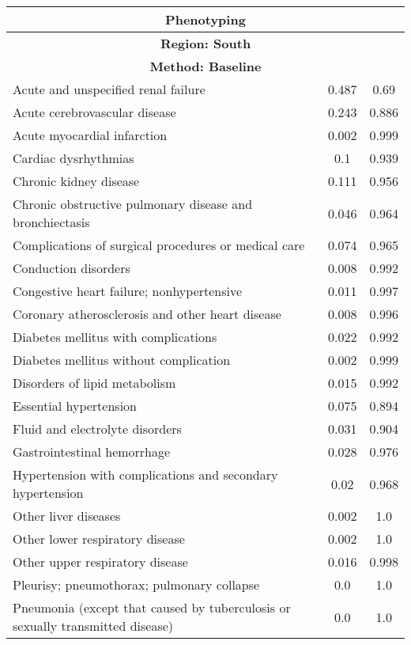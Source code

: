 \documentclass{article}
\begin{document}

\begin{longtable}{lcc}
\toprule
\multicolumn{3}{c}{\textbf{Phenotyping}} \\
\toprule
\endfirsthead

\midrule
\endhead

\multicolumn{3}{c}{\textbf{Region: South}} \\
\multicolumn{3}{c}{\textbf{Method: Baseline}} \\
\midrule
Acute and unspecified renal failure & 0.487 & 0.69 \\
Acute cerebrovascular disease & 0.243 & 0.886 \\
Acute myocardial infarction & 0.002 & 0.999 \\
Cardiac dysrhythmias & 0.1 & 0.939 \\
Chronic kidney disease & 0.111 & 0.956 \\
Chronic obstructive pulmonary disease and bronchiectasis & 0.046 & 0.964 \\
Complications of surgical procedures or medical care & 0.074 & 0.965 \\
Conduction disorders & 0.008 & 0.992 \\
Congestive heart failure; nonhypertensive & 0.011 & 0.997 \\
Coronary atherosclerosis and other heart disease & 0.008 & 0.996 \\
Diabetes mellitus with complications & 0.022 & 0.992 \\
Diabetes mellitus without complication & 0.002 & 0.999 \\
Disorders of lipid metabolism & 0.015 & 0.992 \\
Essential hypertension & 0.075 & 0.894 \\
Fluid and electrolyte disorders & 0.031 & 0.904 \\
Gastrointestinal hemorrhage & 0.028 & 0.976 \\
Hypertension with complications and secondary hypertension & 0.02 & 0.968 \\
Other liver diseases & 0.002 & 1.0 \\
Other lower respiratory disease & 0.002 & 1.0 \\
Other upper respiratory disease & 0.016 & 0.998 \\
Pleurisy; pneumothorax; pulmonary collapse & 0.0 & 1.0 \\
Pneumonia (except that caused by tuberculosis or sexually transmitted disease) & 0.0 & 1.0 \\

\end{longtable}
\end{document}
